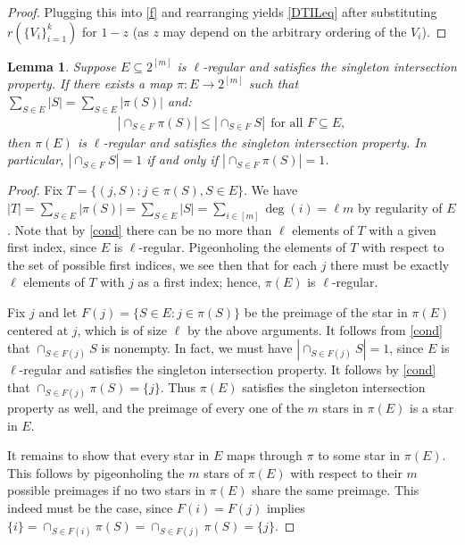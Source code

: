 \documentclass[9pt,twocolumn]{pnas-new}
\newtheorem{lemma}{Lemma}
\begin{document}
\begin{proof}
Plugging this into \eqref{f} and rearranging yields \eqref{DTILeq} after substituting $r(\{V_i\}_{i=1}^k)$ for $1 - z$ (as $z$ may depend on the arbitrary ordering of the $V_i$).
\end{proof}

\begin{lemma}\label{NonEmptyLemma} 
Suppose $E \subseteq 2^{[m]}$ is $\ell$-regular and satisfies the singleton intersection property. If there exists a map $\pi: E \to 2^{[m]}$ such that $\sum_{S \in E} |S| = \sum_{S \in E} |\pi(S)|$ and:
\begin{align}\label{cond}
|\cap_{S \in F} \pi(S)| \leq |\cap_{S \in F} S | \ \ \text{for all } F \subseteq E,
\end{align}
%
then $\pi(E)$ is $\ell$-regular and satisfies the singleton intersection property. In particular, $|\cap_{S \in F} S| = 1$ if and only if $|\cap_{S \in F} \pi(S)| = 1$. 
\end{lemma}
\begin{proof}
Fix $T = \{(j, S): j \in \pi(S), S \in E\}$. We have $|T| = \sum_{S \in E} |\pi(S)| = \sum_{S \in E} |S| = \sum_{i \in [m]} \deg(i) = \ell m$ by regularity of $E$. Note that by \eqref{cond} there can be no more than $\ell$ elements of $T$ with a given first index, since $E$ is $\ell$-regular. Pigeonholing the elements of $T$ with respect to the set of possible first indices, we see then that for each $j$ there must be exactly $\ell$ elements of $T$ with $j$ as a first index; hence, $\pi(E)$ is $\ell$-regular. 

Fix $j$ and let $F(j) = \{S \in E: j \in \pi(S)\}$ be the preimage of the star in $\pi(E)$ centered at $j$, which is of size $\ell$ by the above arguments. It follows from \eqref{cond} that $\cap_{S \in F(j)} S$ is nonempty. In fact, we must have $|\cap _{S \in F(j)} S| = 1$, since $E$ is $\ell$-regular and satisfies the singleton intersection property. It follows by \eqref{cond} that $\cap_{S \in F(j)} \pi(S) = \{j\}$. Thus $\pi(E)$ satisfies the singleton intersection property as well, and the preimage of every one of the $m$ stars in $\pi(E)$ is a star in $E$.

It remains to show that every star in $E$ maps through $\pi$ to some star in $\pi(E)$. This follows by pigeonholing the $m$ stars of $\pi(E)$ with respect to their $m$ possible preimages if no two stars in $\pi(E)$ share the same preimage. This indeed must be the case, since $F(i) = F(j)$ implies $\{i\} = \cap_{S \in F(i)} \pi(S) = \cap_{S \in F(j)} \pi(S) = \{j\}$.
\end{proof}
\end{document}
